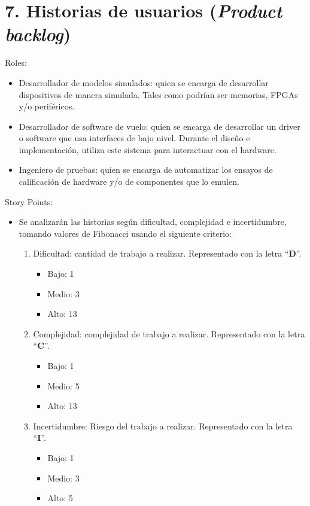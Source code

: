 \section{7. Historias de usuarios (\textit{Product backlog})}
\label{sec:7-historias-de-usuarios-product-backlog}

Roles:

\begin{itemize}
\item Desarrollador de modelos simulados: quien se encarga de desarrollar dispositivos de manera simulada. Tales como podrían ser memorias, FPGAs y/o periféricos.
\item Desarrollador de software de vuelo: quien se encarga de desarrollar un driver o software que usa interfaces de bajo nivel. Durante el diseño e implementación, utiliza este sistema para interactuar con el hardware.
\item Ingeniero de pruebas: quien se encarga de automatizar los ensayos de calificación de hardware y/o de componentes que lo emulen.
\end{itemize}

Story Points:

\begin{itemize}
\item Se analizarán las historias según dificultad, complejidad e incertidumbre, tomando valores de Fibonacci usando el siguiente criterio:
  \begin{enumerate}
  \item Dificultad: cantidad de trabajo a realizar. Representado con la letra ``\textbf{D}''.

    \begin{itemize}
    \item Bajo: 1
    \item Medio: 3
    \item Alto: 13
    \end{itemize}

  \item Complejidad: complejidad de trabajo a realizar. Representado con la letra ``\textbf{C}''.

    \begin{itemize}
    \item Bajo: 1
    \item Medio: 5
    \item Alto: 13
    \end{itemize}

  \item Incertidumbre: Riesgo del trabajo a realizar. Representado con la letra ``\textbf{I}''.

    \begin{itemize}
    \item Bajo: 1
    \item Medio: 3
    \item Alto: 5
    \end{itemize}

  \end{enumerate}

\end{itemize}

